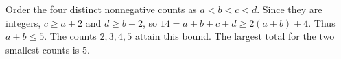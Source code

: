 Order the four distinct nonnegative counts as $a<b<c<d$. Since they are integers, $c\ge a+2$ and $d\ge b+2$, so $14=a+b+c+d\ge2(a+b)+4$. Thus $a+b\le5$. The counts $2,3,4,5$ attain this bound. The largest total for the two smallest counts is $\boxed5$.
